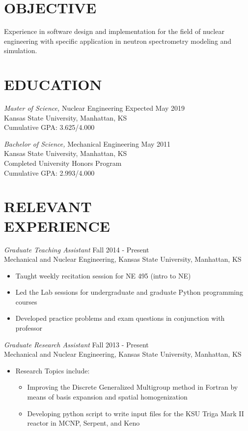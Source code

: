 \documentclass[margin, 10pt]{res} %
\begin{document}
\begin{resume}
 
\section{OBJECTIVE}  

Experience in software design and implementation for the field of nuclear engineering with specific application in neutron spectrometry modeling and simulation.

\section{EDUCATION}

{\sl Master of Science,} Nuclear Engineering \hfill Expected May 2019\\
Kansas State University, Manhattan, KS \\
Cumulative GPA: 3.625/4.000

{\sl Bachelor of Science,} Mechanical Engineering \hfill May 2011 \\
Kansas State University, Manhattan, KS \\
Completed University Honors Program \\
Cumulative GPA: 2.993/4.000

\section{RELEVANT \\ EXPERIENCE}

{\sl Graduate Teaching Assistant} \hfill Fall 2014 - Present \\
Mechanical and Nuclear Engineering, Kansas State University, Manhattan, KS \\
\begin{itemize} \itemsep -2pt %
\item Taught weekly recitation session for NE 495 (intro to NE)
\item Led the Lab sessions for undergraduate and graduate Python programming courses
\item Developed practice problems and exam questions in conjunction with 
professor
\end{itemize}
 
{\sl Graduate Research Assistant} \hfill Fall 2013 - Present \\
Mechanical and Nuclear Engineering, Kansas State University, Manhattan, KS
\begin{itemize} 
\item Research Topics include:
\begin{itemize}
	\item Improving the Discrete Generalized Multigroup method in Fortran by means of basis expansion and spatial homogenization
    \item Developing python script to write input files for the KSU Triga Mark II reactor in MCNP, Serpent, and Keno
\end{itemize}
\end{itemize}


\end{resume}
\end{document}
